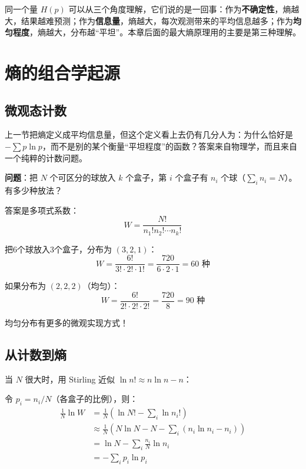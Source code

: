 \begin{insightbox}
同一个量 $H(p)$ 可以从三个角度理解，它们说的是一回事：作为\textbf{不确定性}，熵越大，结果越难预测；作为\textbf{信息量}，熵越大，每次观测带来的平均信息越多；作为\textbf{均匀程度}，熵越大，分布越“平坦”。本章后面的最大熵原理用的主要是第三种理解。
\end{insightbox}

\section{熵的组合学起源}

\subsection{微观态计数}

上一节把熵定义成平均信息量，但这个定义看上去仍有几分人为：为什么恰好是 $-\sum p \ln p$，而不是别的某个衡量“平坦程度”的函数？答案来自物理学，而且来自一个纯粹的计数问题。

\textbf{问题}：把 $N$ 个可区分的球放入 $k$ 个盒子，第 $i$ 个盒子有 $n_i$ 个球（$\sum_i n_i = N$）。有多少种放法？

答案是多项式系数：
\begin{equation}
W = \frac{N!}{n_1! n_2! \cdots n_k!}
\end{equation}

\begin{example}[具体计算]
把6个球放入3个盒子，分布为 $(3, 2, 1)$：
\[
W = \frac{6!}{3! \cdot 2! \cdot 1!} = \frac{720}{6 \cdot 2 \cdot 1} = 60 \text{ 种}
\]

如果分布为 $(2, 2, 2)$（均匀）：
\[
W = \frac{6!}{2! \cdot 2! \cdot 2!} = \frac{720}{8} = 90 \text{ 种}
\]

均匀分布有更多的微观实现方式！
\end{example}

\subsection{从计数到熵}

当 $N$ 很大时，用 Stirling 近似 $\ln n! \approx n \ln n - n$：

令 $p_i = n_i / N$（各盒子的比例），则：
\begin{align}
\frac{1}{N} \ln W &= \frac{1}{N} \left( \ln N! - \sum_i \ln n_i! \right) \\
&\approx \frac{1}{N} \left( N \ln N - N - \sum_i (n_i \ln n_i - n_i) \right) \\
&= \ln N - \sum_i \frac{n_i}{N} \ln n_i \\
&= -\sum_i p_i \ln p_i
\end{align}

